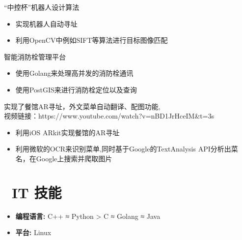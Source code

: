 \documentclass{resume}
\begin{document}
\begin{onehalfspacing}
“中控杯”机器人设计算法
\begin{itemize}
  \item 实现机器人自动寻址
  \item 利用OpenCV中例如SIFT等算法进行目标图像匹配
\end{itemize}
\end{onehalfspacing}

\begin{onehalfspacing}
智能消防栓管理平台
\begin{itemize}
  \item 使用Golang来处理高并发的消防栓通讯
  \item 使用PostGIS来进行消防栓定位以及查询
\end{itemize}
\end{onehalfspacing}

\begin{onehalfspacing}
实现了餐馆AR寻址，外文菜单自动翻译、配图功能, \\
视频链接：https://www.youtube.com/watch?v=nBD1JrHceIM&t=3s
\begin{itemize}
  \item 利用iOS ARkit实现餐馆的AR寻址
  \item 利用微软的OCR来识别菜单,同时基于Google的TextAnalysis API分析出菜名，在Google上搜索并爬取图片
\end{itemize}
\end{onehalfspacing}


\section{\faCogs\ IT 技能}
\begin{itemize}[parsep=0.5ex]
  \item \textbf{编程语言: }
  C++ ≈ Python > C ≈ Golang ≈ Java
  \item \textbf{平台: }
  Linux

\end{itemize}
\end{document}
